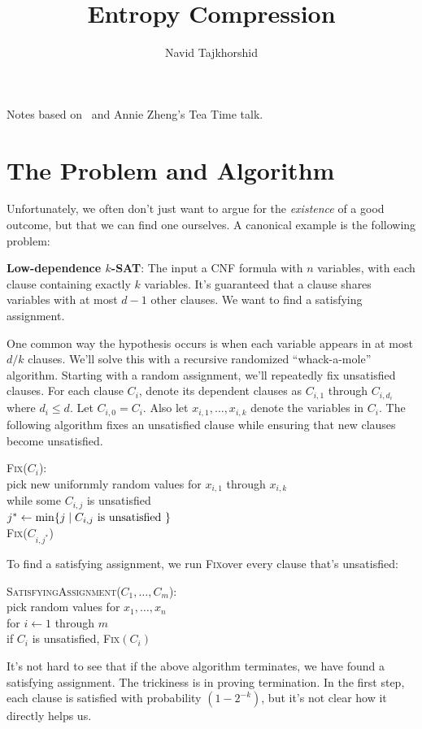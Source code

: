 \documentclass[12pt]{article}
\begin{document}
\title{Entropy Compression}
\author{Navid Tajkhorshid}

\maketitle

Notes based on~\cite{Moser08} and Annie Zheng's Tea Time talk.

\section{The Problem and Algorithm}

Unfortunately, we often don't just want to argue for the \textit{existence} of a
good outcome, but that we can find one ourselves. A canonical example is the
following problem:

\begin{framed}
  \textbf{Low-dependence $k$-SAT}: The input a CNF formula with $n$ variables,
  with each clause containing exactly $k$ variables. It's guaranteed that a
  clause shares variables with at most $d - 1$ other clauses. We want to find a
  satisfying assignment.
\end{framed}

\def\Fix{\textsc{Fix}}
One common way the hypothesis occurs is when each variable appears in at most
$d/k$ clauses. We'll solve this with a recursive randomized ``whack-a-mole''
algorithm. Starting with a random assignment, we'll repeatedly fix unsatisfied
clauses. For each clause $C_i$, denote its dependent clauses as $C_{i, 1}$
through $C_{i, d_i}$ where $d_i \leq d$. Let $C_{i, 0} = C_i$. Also let
$x_{i, 1}, \dots, x_{i, k}$ denote the variables in $C_i$. The following
algorithm fixes an unsatisfied clause while ensuring that new clauses become
unsatisfied.
\begin{centeralgo}
  \Fix($C_i$):\\
  \> pick new unifornmly random values for $x_{i, 1}$ through $x_{i, k}$ \\
  \> while some $C_{i, j}$ is unsatisfied \\
  \> \> $j^* \gets \min\Set{j \mid C_{i, j} \text{ is unsatisfied }}$ \\
  \> \> \Fix($C_{i, j^*}$) \\
\end{centeralgo}
To find a satisfying assignment, we run \Fix over every clause that's
unsatisfied:
\begin{centeralgo}
  \textsc{SatisfyingAssignment}($C_1, \dots, C_m$):\\
  \> pick random values for $x_1, \dots, x_n$ \\
  \> for $i \gets 1$ through $m$ \\
  \> \> if $C_i$ is unsatisfied, \Fix$(C_i)$
\end{centeralgo}
It's not hard to see that if the above algorithm terminates, we have found a
satisfying assignment. The trickiness is in proving termination. In the first
step, each clause is satisfied with probability $(1 - 2^{-k})$, but it's not
clear how it directly helps us.
\end{document}
